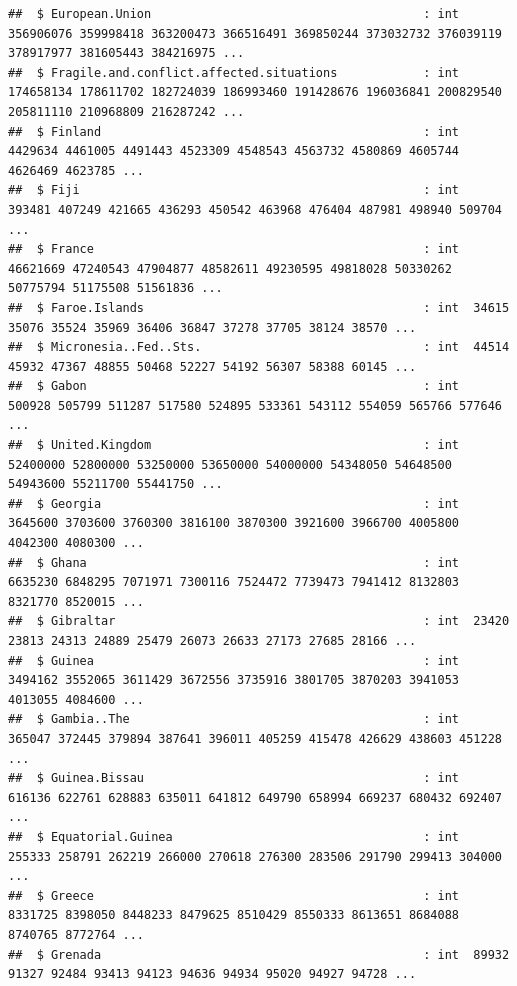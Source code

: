 \documentclass[12pt,]{article}
\begin{document}
\begin{verbatim}
##  $ European.Union                                      : int  356906076 359998418 363200473 366516491 369850244 373032732 376039119 378917977 381605443 384216975 ...
##  $ Fragile.and.conflict.affected.situations            : int  174658134 178611702 182724039 186993460 191428676 196036841 200829540 205811110 210968809 216287242 ...
##  $ Finland                                             : int  4429634 4461005 4491443 4523309 4548543 4563732 4580869 4605744 4626469 4623785 ...
##  $ Fiji                                                : int  393481 407249 421665 436293 450542 463968 476404 487981 498940 509704 ...
##  $ France                                              : int  46621669 47240543 47904877 48582611 49230595 49818028 50330262 50775794 51175508 51561836 ...
##  $ Faroe.Islands                                       : int  34615 35076 35524 35969 36406 36847 37278 37705 38124 38570 ...
##  $ Micronesia..Fed..Sts.                               : int  44514 45932 47367 48855 50468 52227 54192 56307 58388 60145 ...
##  $ Gabon                                               : int  500928 505799 511287 517580 524895 533361 543112 554059 565766 577646 ...
##  $ United.Kingdom                                      : int  52400000 52800000 53250000 53650000 54000000 54348050 54648500 54943600 55211700 55441750 ...
##  $ Georgia                                             : int  3645600 3703600 3760300 3816100 3870300 3921600 3966700 4005800 4042300 4080300 ...
##  $ Ghana                                               : int  6635230 6848295 7071971 7300116 7524472 7739473 7941412 8132803 8321770 8520015 ...
##  $ Gibraltar                                           : int  23420 23813 24313 24889 25479 26073 26633 27173 27685 28166 ...
##  $ Guinea                                              : int  3494162 3552065 3611429 3672556 3735916 3801705 3870203 3941053 4013055 4084600 ...
##  $ Gambia..The                                         : int  365047 372445 379894 387641 396011 405259 415478 426629 438603 451228 ...
##  $ Guinea.Bissau                                       : int  616136 622761 628883 635011 641812 649790 658994 669237 680432 692407 ...
##  $ Equatorial.Guinea                                   : int  255333 258791 262219 266000 270618 276300 283506 291790 299413 304000 ...
##  $ Greece                                              : int  8331725 8398050 8448233 8479625 8510429 8550333 8613651 8684088 8740765 8772764 ...
##  $ Grenada                                             : int  89932 91327 92484 93413 94123 94636 94934 95020 94927 94728 ...

\end{verbatim}
\end{document}
